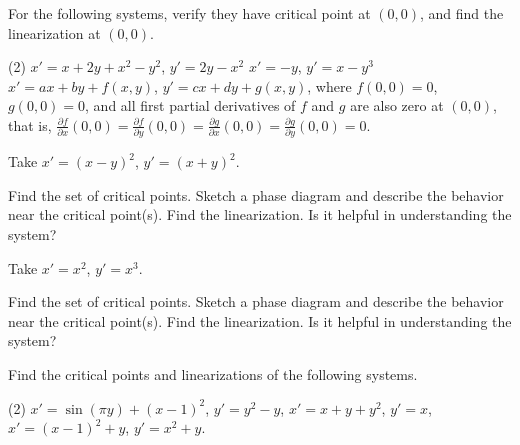\begin{exercise}
For the following systems, verify they have critical point at $(0,0)$,
and find the linearization at $(0,0)$.
\begin{tasks}(2)
\task $x'=x+2y+x^2-y^2$, \enspace $y'=2y-x^2$
\task $x'=-y$, \enspace $y'=x-y^3$
\task* $x'=ax+by+f(x,y)$, $y'=cx+dy+g(x,y)$, where
$f(0,0) = 0$,
$g(0,0) = 0$, and all first partial derivatives of $f$ and $g$ are
also zero at $(0,0)$, that is,
$\frac{\partial f}{\partial x}(0,0) = 
\frac{\partial f}{\partial y}(0,0) = 
\frac{\partial g}{\partial x}(0,0) = 
\frac{\partial g}{\partial y}(0,0) = 0$.
\end{tasks}
\end{exercise}

\begin{exercise}
Take $x'=(x-y)^2$, \enspace $y'=(x+y)^2$. 
\begin{tasks}
\task Find the set of critical points.
\task Sketch a phase diagram and describe the behavior near the critical
point(s).
\task Find the linearization.  Is it helpful in understanding the system?
\end{tasks}
\end{exercise}

\begin{exercise}
Take $x'=x^2$, \enspace $y'=x^3$.
\begin{tasks}
\task Find the set of critical points.
\task Sketch a phase diagram and describe the behavior near the critical
point(s).
\task Find the linearization.  Is it helpful in understanding the system?
\end{tasks}
\end{exercise}

\setcounter{exercise}{100}

\pagebreak[2]
\begin{exercise}
Find the critical points and linearizations of the following systems.
\begin{tasks}(2)
\task $x'=\sin(\pi y)+(x-1)^2$, \enspace $y'=y^2-y$,
\task $x'=x+y+y^2$, \enspace $y'=x$,
\task $x'=(x-1)^2+y$, \enspace $y'=x^2+y$.
\end{tasks}
\end{exercise}

